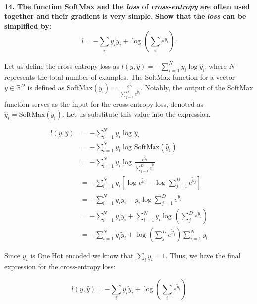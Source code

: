 \documentclass{article}
\theoremstyle{plain}%
\theoremstyle{definition}
\theoremstyle{remark}
\begin{document}
\paragraph{14. The function SoftMax and the \textit{loss} of \textit{cross-entropy} are often used together and their gradient is very simple. Show that the \textit{loss} can be simpliﬁed by:
    \[l = - \sum_{i}^{} y_i \tilde{y}_i + \log_{} (\sum_{i}^{} e^{\tilde{y}_i}).\]}
Let us define the cross-entropy loss as \( l(y, \hat{y}) = - \sum_{i=1}^{N} y_i \log \hat{y}_i \), where \( N \) represents the total number of examples. The SoftMax function for a vector \( \tilde{y} \in \mathbb{R}^D \) is defined as \( \text{SoftMax}(\tilde{y_i}) = \frac{e^{\tilde{y_i}}}{\sum_{j=1}^{D} e^{\tilde{y_j}}} \). Notably, the output of the SoftMax function serves as the input for the cross-entropy loss, denoted as \( \hat{y}_i = \text{SoftMax}(\tilde{y_i}) \). Let us substitute this value into the expression.

\begin{align*}
    l(y, \hat{y}) & = - \sum_{i=1}^{N} y_i \log_{} \hat{y}_i                                                                \\
                  & = - \sum_{i=1}^{N} y_i \log_{} \text{SoftMax}(\tilde{y_i})                                              \\
                  & = - \sum_{i=1}^{N} y_i \log_{} \frac{e^{\tilde{y_i}}}{\sum_{j=1}^{D} e^{\tilde{y_j}} }                  \\
                  & = - \sum_{i=1}^{N} y_i \left[ \log_{} e^{\tilde{y}_i} - \log_{} \sum_{j=1}^{D} e^{\tilde{y}_j}  \right] \\
                  & = - \sum_{i=1}^{N} y_i \tilde{y}_i - y_i \log_{} \sum_{j=1}^{D}e^{\tilde{y}_j}                          \\
                  & = - \sum_{i=1}^{N} y_i \tilde{y}_i + \sum_{i=1}^{N} y_i \log_{} (\sum_{j}^{D}e^{\tilde{y}_j}) \\
                  & = - \sum_{i=1}^{N} y_i \tilde{y}_i + \log_{} (\sum_{j}^{D}e^{\tilde{y}_j}) \sum_{i=1}^{N} y_i 
\end{align*}

Since $y_i$ is One Hot encoded we know that $\sum_i y_i = 1$. Thus, we have the final expression for the cross-entropy loss:

$$ l(y, \hat{y}) = - \sum_{i}^{} y_i \tilde{y}_i + \log_{} \left(\sum_{i}^{} e^{\tilde{y}_i}\right) $$
\end{document}
